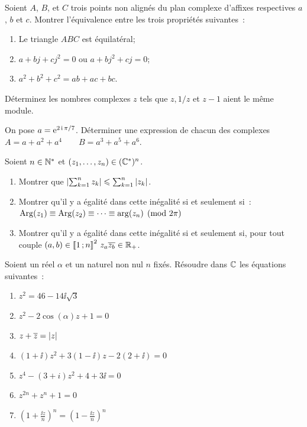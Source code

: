 \begin{exercice}
    Soient \(A\), \(B\), et \(C\) trois points non alignés du plan complexe d'affixes respectives \(a\), \(b\) et \(c\). Montrer l'équivalence entre les trois propriétés suivantes~:
    \begin{enumerate}
        \item Le triangle \(ABC\) est équilatéral;
        \item \(a+bj+cj^2=0\) ou \(a+bj^2+cj=0\);
        \item \(a^2+b^2+c^2=ab+ac+bc\).
    \end{enumerate}
\end{exercice}
\begin{exercice}
    Déterminez les nombres complexes \(z\) tels que \(z, 1/z\) et \(z-1\) aient le même module.
\end{exercice}
\begin{exercice}
    On pose \(a=\operatorname{e}^{2\operatorname{i}\pi/7}\). Déterminer une expression de chacun des complexes \(A = a+a^2+a^4 \qquad B = a^3+a^5+a^6\).
\end{exercice}
\begin{exercice}
    Soient \(n \in \mathbb{N}^{*}\) et \((z_1, \ldots, z_n) \in (\mathbb{C}^{*})^n\).
    \begin{enumerate}
        \item Montrer que \( \left\lvert\sum_{k=1}^n z_k\right\rvert \leqslant \sum_{k=1}^n \left\lvert z_k\right\rvert\).
        \item Montrer qu'il y a égalité dans cette inégalité si et seulement si~: \(\operatorname{Arg}(z_1) \equiv \operatorname{Arg}(z_2) \equiv \cdots \equiv \arg(z_n) \pmod{2\pi}\)
        \item Montrer qu'il y a égalité dans cette inégalité si et seulement si, pour tout couple \((a,b) \in \mathopen{\llbracket}1\mathclose{}\mathpunct{};n\mathclose{\rrbracket}^2 \ z_a \overline{z_b} \in \mathbb{R}_{+}\).
    \end{enumerate}
\end{exercice}
\begin{exercice}
    Soient un réel \(\alpha\) et un naturel non nul \(n\) fixés. Résoudre dans \(\mathbb{C}\) les équations suivantes~:
    \begin{multicols}{2}
        \begin{enumerate}
            \item \(z^2 = 46-14\ii\sqrt{3}\)
            \item \(z^2-2\cos(\alpha)z+1=0\)
            \item \(z+\overline{z}=\left\lvert z\right\rvert\)
            \item \((1+\ii)z^2+3(1-\ii)z-2(2+\ii)=0\)
            \item \(z^4-(3+i)z^2+4+3\ii=0\)
            \item \(z^{2n}+z^n+1=0\)
            \item \(\left(1+\frac{\ii z}{n}\right)^n = \left(1-\frac{\ii z}{n}\right)^n\)
        \end{enumerate}
    \end{multicols}
\end{exercice}
